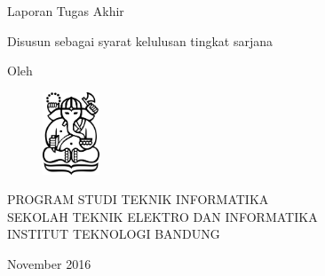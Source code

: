 \clearpage
\pagestyle{empty}

\begin{center}
\smallskip

    \Large \bfseries \MakeUppercase{\thetitle}
    \vfill

    \Large Laporan Tugas Akhir
    \vfill

    \large Disusun sebagai syarat kelulusan tingkat sarjana
    \vfill

    \large Oleh

    \Large \theauthor

    \vfill
    \begin{figure}[h]
        \centering
      	\includegraphics[width=0.15\textwidth]{resources/cover-ganesha}
    \end{figure}
    \vfill

    \large
    \uppercase{
        Program Studi Teknik Informatika \\
        Sekolah Teknik Elektro dan Informatika \\
        Institut Teknologi Bandung
    }

    November 2016

\end{center}

\clearpage
